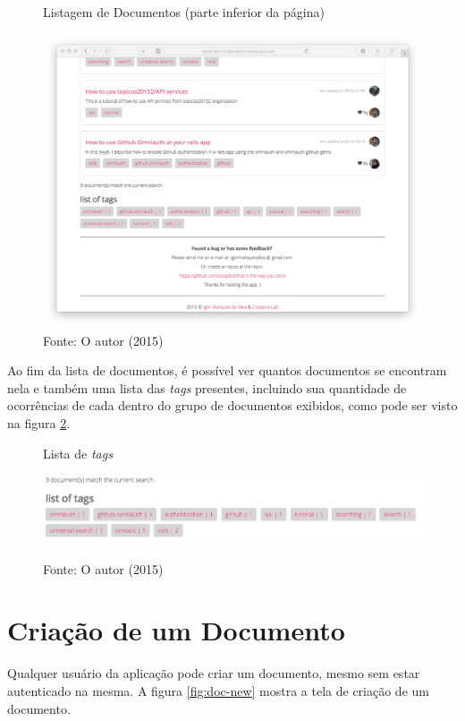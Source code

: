 \begin{figure}[h]
	\centering
    \caption{Listagem de Documentos (parte inferior da página)}
		\label{fig:doc-list-2}
    \includegraphics[width=15cm]{Imagens/print-lista-2.png}
	\caption*{Fonte: O autor (2015)}
\end{figure}

Ao fim da lista de documentos, é possível ver quantos documentos se encontram nela e também uma lista das \textit{tags} presentes, incluindo sua quantidade de ocorrências de cada dentro do grupo de documentos exibidos, como pode ser visto na figura \ref{fig:doc-tags}.

\begin{figure}[h]
	\centering
    \caption{Lista de \textit{tags}}
    \includegraphics[width=15cm]{Imagens/print-tags.png}
		\label{fig:doc-tags}
	\caption*{Fonte: O autor (2015)}
\end{figure}


\section{Criação de um Documento}

Qualquer usuário da aplicação pode criar um documento, mesmo sem estar autenticado na mesma. A figura \ref{fig:doc-new} mostra a tela de criação de um documento.

